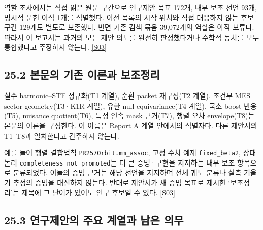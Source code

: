 \documentclass[11pt,a4paper]{article}
\begin{document}
역할 조사에서는 직접 읽은 원문 구간으로 연구제안 목표 172개, 내부 보조 선언 93개, 명시적 문헌 이식 1개를 식별했다. 이전 목록의 시작 위치와 직접 대응하지 않는 후보 구간 129개도 별도로 보존했다. 반면 기존 검색 묶음 39,072개의 역할은 아직 보류다. 따라서 이 보고서는 과거의 모든 제안 의도를 완전히 판정했다거나 수학적 동치를 모두 통합했다고 주장하지 않는다. \hyperlink{src:S03}{[S03]}


\subsection*{25.2 본문의 기존 이론과 보조정리}

실수 harmonic–STF 정규화(T1 계열), 순환 packet 재구성(T2 계열), 조건부 MES sector geometry(T3·K1R 계열), 유한-null equivariance(T4 계열), 국소 boost 반응(T5), nuisance quotient(T6), 특정 연속 mask 근거(T7), 행렬 오차 envelope(T8)는 본문의 이론을 구성한다. 이 이름은 Report A 계열 안에서의 식별자다. 다른 제안서의 T1–T8과 일치한다고 간주하지 않는다.


예를 들어 행렬 결합법칙 \texttt{PR257Orbit.mm\_assoc}, 고정 수치 예제 \texttt{fixed\_beta2}, 상태 논리 \texttt{completeness\_not\_promoted}는 더 큰 증명·구현을 지지하는 내부 보조 항목으로 분류되었다. 이들의 증명 근거는 해당 선언을 지지하며 전체 궤도 분류나 실측 기울기 추정의 증명을 대신하지 않는다. 반대로 제안서가 새 증명 목표로 제시한 ‘보조정리’는 제목에 그 단어가 있어도 연구 후보일 수 있다. \hyperlink{src:S03}{[S03]}


\subsection*{25.3 연구제안의 주요 계열과 남은 의무}
\end{document}
